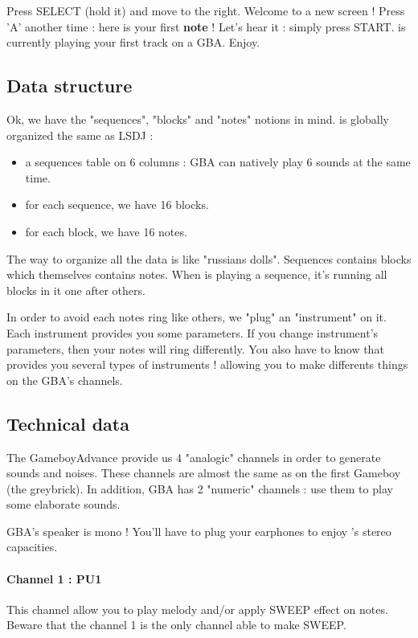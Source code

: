 
Press SELECT (hold it) and move to the right. Welcome to a new screen !
Press 'A' another time : here is your first {\bf note} !
Let's hear it : simply press START. \FAT is currently playing your first track on a GBA. Enjoy.


\subsection{Data structure}

Ok, we have the "sequences", "blocks" and "notes" notions in mind. \FAT is globally organized the same as LSDJ :
\begin{itemize}
    \item{a sequences table on 6 columns : GBA can natively play 6 sounds at the same time.}
    \item{for each sequence, we have 16 blocks.}
    \item{for each block, we have 16 notes.}
\end{itemize}\medskip

The way to organize all the data is like "russians dolls". Sequences contains blocks which themselves contains notes.
When \FAT is playing a sequence, it's running all blocks in it one after others.

In order to avoid each notes ring like others, we "plug" an "instrument" on it.
Each instrument provides you some parameters.
If you change instrument's parameters, then your notes will ring differently.
You also have to know that \FAT provides you several types of instruments ! allowing you to make differents things on the GBA's channels.

\subsection{Technical data}

The GameboyAdvance provide us 4 "analogic" channels in order to generate sounds and noises.
These channels are almost the same as on the first Gameboy (the greybrick).
In addition, GBA has 2 "numeric" channels : use them to play some elaborate sounds.

GBA's speaker is mono ! You'll have to plug your earphones to enjoy \FAT's stereo capacities.

\paragraph{Channel 1 : PU1} This channel allow you to play melody and/or apply SWEEP effect on notes. Beware that the channel 1 is the only channel able to make SWEEP.

